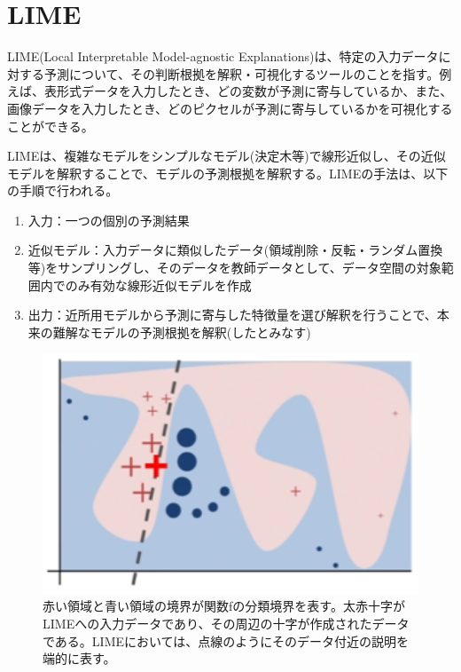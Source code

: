 \documentclass{ltjsarticle}
\begin{document}
\clearpage
\section{LIME}
LIME(Local Interpretable Model-agnostic Explanations)は、特定の入力データに対する予測について、その判断根拠を解釈・可視化するツールのことを指す。例えば、表形式データを入力したとき、どの変数が予測に寄与しているか、また、画像データを入力したとき、どのピクセルが予測に寄与しているかを可視化することができる。
\par
LIMEは、複雑なモデルをシンプルなモデル(決定木等)で線形近似し、その近似モデルを解釈することで、モデルの予測根拠を解釈する。LIMEの手法は、以下の手順で行われる。
\par
\begin{enumerate}
  \item 入力：一つの個別の予測結果
  \item 近似モデル：入力データに類似したデータ(領域削除・反転・ランダム置換等)をサンプリングし、そのデータを教師データとして、データ空間の対象範囲内でのみ有効な線形近似モデルを作成
  \item 出力：近所用モデルから予測に寄与した特徴量を選び解釈を行うことで、本来の難解なモデルの予測根拠を解釈(したとみなす)
\end{enumerate}

\begin{figure}[htbp]
  \centering
  \includegraphics[width=14cm]{./capture/LIME_explain.png}
  \caption{赤い領域と青い領域の境界が関数fの分類境界を表す。太赤十字がLIMEへの入力データであり、その周辺の十字が作成されたデータである。LIMEにおいては、点線のようにそのデータ付近の説明を端的に表す。}
  \label{fig:LIME}
\end{figure}
\end{document}

